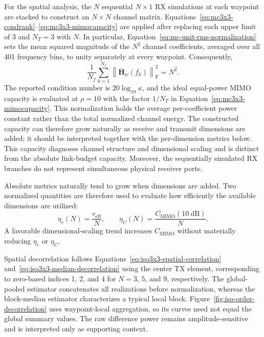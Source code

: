 For the spatial analysis, the $N$ sequential $N\times1$ RX simulations at each waypoint are stacked to construct an $N\times N$ channel matrix. Equations~\ref{eq:mc3x3-condrank}--\ref{eq:mc3x3-mimocapacity} are applied after replacing each upper limit of 3 and $N_T=3$ with $N$. In particular, Equation~\ref{eq:mc-unit-rms-normalization} sets the mean squared magnitude of the $N^2$ channel coefficients, averaged over all 401 frequency bins, to unity separately at every waypoint. Consequently,
\begin{equation}
    \frac{1}{N_f}\sum_{k=1}^{N_f}
    \left\lVert\overline{\mathbf{H}}_w(f_k)\right\rVert_{\mathrm{F}}^2=N^2.
    \label{eq:iso-order-rms-energy}
\end{equation}
The reported condition number is $20\log_{10}\kappa$, and the ideal equal-power MIMO capacity is evaluated at $\rho=10$ with the factor $1/N_T$ in Equation~\ref{eq:mc3x3-mimocapacity}. This normalization holds the average per-coefficient power constant rather than the total normalized channel energy. The constructed capacity can therefore grow naturally as receive and transmit dimensions are added; it should be interpreted together with the per-dimension metrics below. This capacity diagnoses channel structure and dimensional scaling and is distinct from the absolute link-budget capacity. Moreover, the sequentially simulated RX branches do not represent simultaneous physical receiver ports.

Absolute metrics naturally tend to grow when dimensions are added. Two normalized quantities are therefore used to evaluate how efficiently the available dimensions are utilized:
\begin{equation}
    \eta_r(N)=\frac{r_\mathrm{eff}}{N},
    \qquad
    \eta_C(N)=\frac{C_\mathrm{MIMO}(10~\mathrm{dB})}{N}.
    \label{eq:iso-order-normalized-metrics}
\end{equation}
A favorable dimensional-scaling trend increases $C_\mathrm{MIMO}$ without materially reducing $\eta_r$ or $\eta_C$.

Spatial decorrelation follows Equations~\ref{eq:iso3x3-spatial-correlation} and~\ref{eq:iso3x3-median-decorrelation} using the center TX element, corresponding to zero-based indices 1, 2, and 4 for $N=3$, $5$, and $9$, respectively. The global-pooled estimator concatenates all realizations before normalization, whereas the block-median estimator characterizes a typical local block. Figure~\ref{fig:iso-order-decorrelation} uses waypoint-local aggregation, so its curves need not equal the global summary values. The raw difference power remains amplitude-sensitive and is interpreted only as supporting context.

